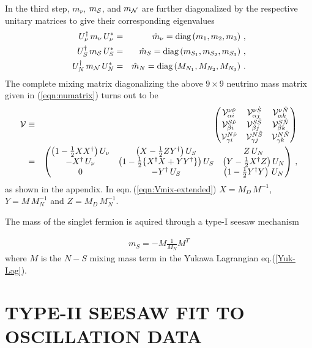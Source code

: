 \documentclass[a4paper,11pt]{article}
\newcommand{\bea}{\begin{eqnarray}}
\newcommand{\eea}{\end{eqnarray}}
\newcommand{\bmt}{\begin{pmatrix}}
\newcommand{\emt}{\end{pmatrix}}
\begin{document}
In the third step, $m_{\nu}$, $m_{\cal S}$, and $m_{\cal N}$ are further diagonalized 
by the respective unitary matrices to give their corresponding eigenvalues
\begin{eqnarray}
U^\dagger_\nu\, m_{\nu}\, U^*_{\nu}  &=& \hat{m}_\nu = 
         \text{diag}\left(m_{1}, m_{2}, m_{3}\right)\, , \nonumber \\ 
U^\dagger_S\, m_{\cal S}\, U^*_{S}  &=& \hat{m}_S = 
         \text{diag}\left(m_{S_1}, m_{S_2}, m_{S_3}\right)\, , \nonumber \\
U^\dagger_N\, m_{\cal N}\, U^*_{N}  &=& \hat{m}_N = 
         \text{diag}\left(M_{N_1}, M_{N_2}, M_{N_3}\right)\, .
\label{eq:nudmass}
\end{eqnarray}
\noindent
The complete mixing matrix \cite{LG:2000,app:2013} diagonalizing the above $9 \times 9$ 
neutrino mass matrix given in 
(\ref{eqn:numatrix}) turns out to be
 \begin{eqnarray}
\mathcal{V}&\equiv&
\bmt 
{\cal V}^{\nu\hat{\nu}}_{\alpha i} & {\cal V}^{\nu{\hat{S}}}_{\alpha j} & {\cal V}^{\nu \hat{N}}_{\alpha k} \\
{\cal V}^{S\hat{\nu}}_{\beta i} & {\cal V}^{S\hat{S}}_{\beta j} & {\cal V}^{S\hat{N}}_{\beta k} \\
{\cal V}^{N\hat{\nu}}_{\gamma i} & {\cal V}^{N\hat{S}}_{\gamma j} & {\cal V}^{N\hat{N}}_{\gamma k} 
\emt \\
&=&\bmt 
\left(1-\frac{1}{2}XX^\dagger \right) U_\nu  & 
\left(X-\frac{1}{2}ZY^\dagger \right) U_{S} & 
Z\,U_{N}     \\
-X^\dagger\, U_\nu   &
\left(1-\frac{1}{2} \{X^\dagger X + YY^\dagger \}\right) U_{S} &
\left(Y-\frac{1}{2} X^\dagger Z\right) U_{N}   \\
0 &-Y^\dagger\, U_{S} & \left(1-\frac{1}{2}Y^\dagger Y\right)\, U_{N} 
\emt \, ,
 \label{eqn:Vmix-extended}
\end{eqnarray}
as shown in the appendix. In eqn.\,(\ref{eqn:Vmix-extended}) $X = M_D\,M^{-1}$, $Y=M\, 
M^{-1}_N$ and $Z=M_D\,M^{-1}_N$.

The mass of the singlet fermion is aquired through a type-I seesaw mechanism 

\bea
m_S=-M\frac{1}{M_N}M^T \label{matms}
\eea
where $M$ is the $N-S$ mixing mass term in the Yukawa Lagrangian  eq.(\ref{Yuk-Lag}). 


\section{ TYPE-II SEESAW FIT TO OSCILLATION DATA}\label{sec:t2fit}
\end{document}
